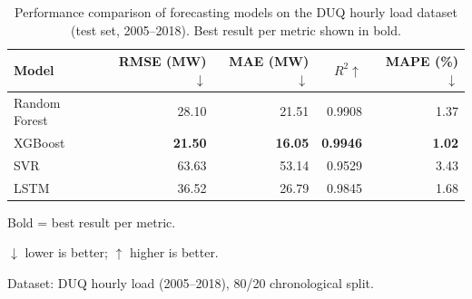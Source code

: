 \begin{table}[htbp]
  \centering
  \caption{Performance comparison of forecasting models on the DUQ hourly load dataset (test set, 2005--2018). Best result per metric shown in bold.}
  \label{tab:model_comparison}
  \begin{tabular}{lrrrr}
    \toprule
    \textbf{Model} & \textbf{RMSE (MW)$\downarrow$} & \textbf{MAE (MW)$\downarrow$} & \textbf{$R^2$$\uparrow$} & \textbf{MAPE (\%)$\downarrow$} \\
    \midrule
    Random Forest & 28.10 & 21.51 & 0.9908 & 1.37 \\
    XGBoost & \textbf{21.50} & \textbf{16.05} & \textbf{0.9946} & \textbf{1.02} \\
    SVR & 63.63 & 53.14 & 0.9529 & 3.43 \\
    LSTM & 36.52 & 26.79 & 0.9845 & 1.68 \\
    \bottomrule
  \end{tabular}
  \begin{tablenotes}
    \small
    \item Bold = best result per metric.
    \item $\downarrow$ lower is better; $\uparrow$ higher is better.
    \item Dataset: DUQ hourly load (2005--2018), 80/20 chronological split.
  \end{tablenotes}
\end{table}